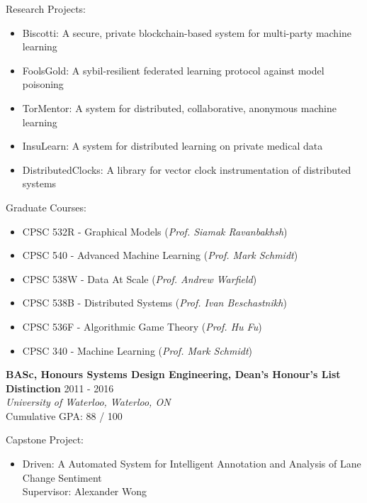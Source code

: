 \documentclass[10pt]{res} %
\begin{document}
Research Projects:
\begin{itemize}   
    \item Biscotti: A secure, private blockchain-based system for multi-party machine learning
    \item FoolsGold: A sybil-resilient federated learning protocol against 
    model poisoning 
    \item TorMentor: A system for distributed, collaborative, anonymous
    machine learning
    \item InsuLearn: A system for distributed learning on private
    medical data
    \item DistributedClocks: A library for vector clock instrumentation
    of distributed systems
\end{itemize}

Graduate Courses:
\begin{itemize} 
    \item CPSC 532R - Graphical Models (\emph{Prof. Siamak Ravanbakhsh})
    \item CPSC 540 - Advanced Machine Learning (\emph{Prof. Mark
    Schmidt})
    \item CPSC 538W - Data At Scale (\emph{Prof. Andrew Warfield})
    \item CPSC 538B - Distributed Systems (\emph{Prof. Ivan
    Beschastnikh})
    \item CPSC 536F - Algorithmic Game Theory (\emph{Prof. Hu Fu})
    \item CPSC 340 - Machine Learning (\emph{Prof. Mark Schmidt})
\end{itemize}


\textbf {BASc, Honours Systems Design Engineering, Dean's Honour's List Distinction} \hfill 2011 - 2016 \\ 
{\sl University of Waterloo, Waterloo, ON} \\
Cumulative GPA: 88 / 100

Capstone Project:
\begin{itemize}   
    \item Driven: A Automated System for Intelligent Annotation and Analysis of Lane Change Sentiment\\
    Supervisor: Alexander Wong
\end{itemize}
\end{document}
